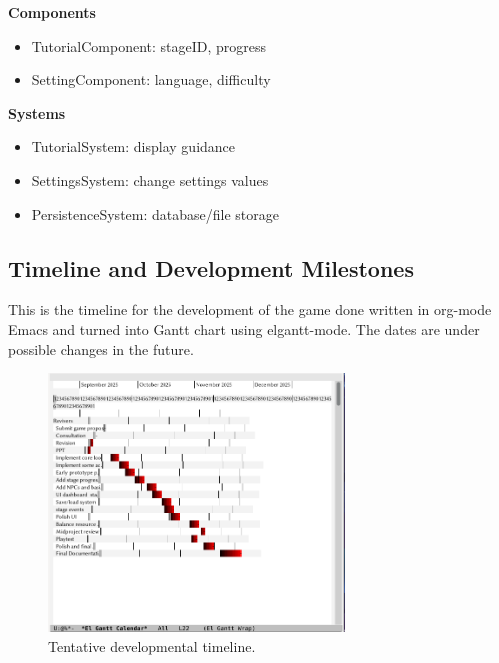 \documentclass[11pt]{article}
\begin{document}
\textbf{Components}
\begin{itemize}
\item
  TutorialComponent: stageID, progress
\item
  SettingComponent: language, difficulty
\end{itemize}

\textbf{Systems}
\begin{itemize}
\item
  TutorialSystem: display guidance
\item
  SettingsSystem: change settings values
\item
  PersistenceSystem: database/file storage
\end{itemize}


\subsection{Timeline and Development Milestones}
This is the timeline for the development of the game done written in org-mode Emacs and turned into Gantt chart using elgantt-mode. The dates are under possible changes in the future.\\

\begin{figure}[H]
  \centering
  \includegraphics[width=0.7\textwidth]{../images/elgantt.png}
  \caption{Tentative developmental timeline.}
  \label{fig:gantt}
\end{figure}
\end{document}
